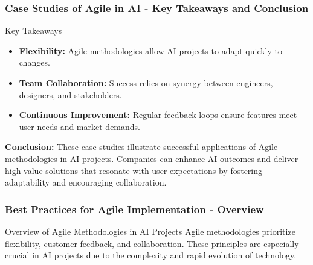 \documentclass{beamer}
\begin{document}
\begin{frame}[fragile]
    \frametitle{Case Studies of Agile in AI - Key Takeaways and Conclusion}
    \begin{block}{Key Takeaways}
        \begin{itemize}
            \item \textbf{Flexibility:} Agile methodologies allow AI projects to adapt quickly to changes.
            \item \textbf{Team Collaboration:} Success relies on synergy between engineers, designers, and stakeholders.
            \item \textbf{Continuous Improvement:} Regular feedback loops ensure features meet user needs and market demands.
        \end{itemize}
    \end{block}
    
    \textbf{Conclusion:} These case studies illustrate successful applications of Agile methodologies in AI projects. Companies can enhance AI outcomes and deliver high-value solutions that resonate with user expectations by fostering adaptability and encouraging collaboration.
\end{frame}

\begin{frame}[fragile]
    \frametitle{Best Practices for Agile Implementation - Overview}
    \begin{block}{Overview of Agile Methodologies in AI Projects}
        Agile methodologies prioritize flexibility, customer feedback, and collaboration. These principles are especially crucial in AI projects due to the complexity and rapid evolution of technology.
    \end{block}
\end{frame}
\end{document}
